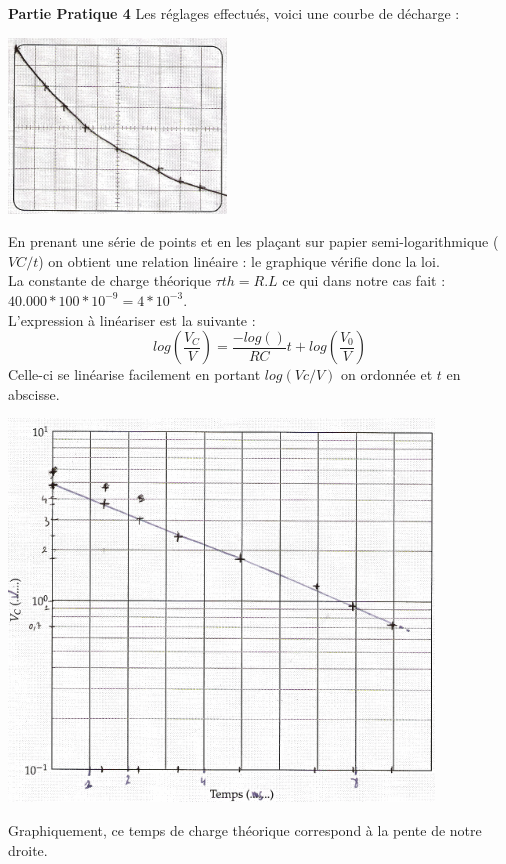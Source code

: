 \documentclass	[11pt, a4paper, openany]{book}
\begin{document}
\textbf{Partie Pratique 4}
Les réglages effectués, voici une courbe de décharge : 
\begin{center}
\includegraphics[scale=0.5]{labo/image22.png}
\end{center}
En prenant une série de points et en les plaçant sur papier semi-logarithmique ($VC/t$) on obtient une relation linéaire : le graphique vérifie donc la loi.\\
La constante de charge théorique $\tau{th} = R.L$ ce qui dans notre cas fait : $40.000 * 100 * 10^{-9} = 4*10^{-3}$.\\
L'expression à linéariser est la suivante : 
\begin{equation}
log\left(\frac{V_C}{V}\right) = \frac{-log()}{RC}t + log\left(\frac{V_0}{V}\right)
\end{equation}
Celle-ci se linéarise facilement en portant $log(Vc/V)$ on ordonnée et $t$ en abscisse.
\begin{center}
\includegraphics[scale=0.5]{labo/image23.png}
\end{center}
Graphiquement, ce temps de charge théorique correspond à la pente de notre droite.\\
\end{document}

